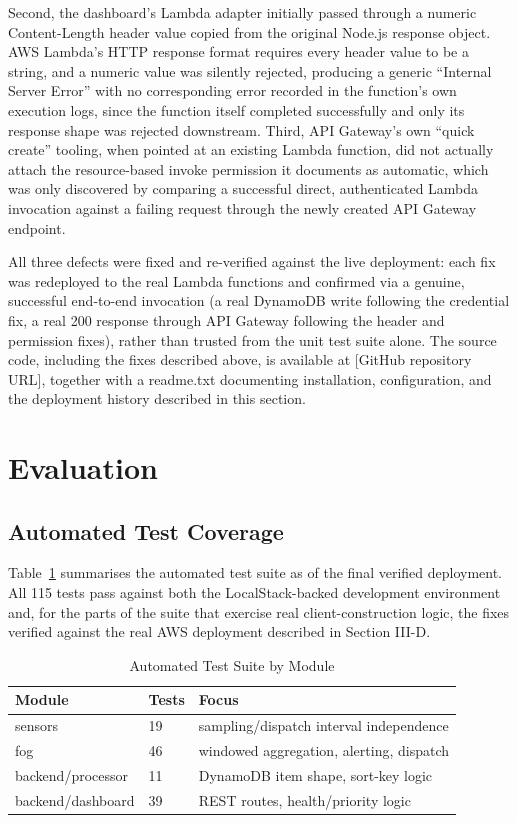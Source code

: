 \documentclass[conference]{IEEEtran}
\begin{document}
Second, the dashboard's Lambda adapter initially passed through a numeric Content-Length header value copied from the original Node.js response object. AWS Lambda's HTTP response format requires every header value to be a string, and a numeric value was silently rejected, producing a generic ``Internal Server Error'' with no corresponding error recorded in the function's own execution logs, since the function itself completed successfully and only its response shape was rejected downstream. Third, API Gateway's own ``quick create'' tooling, when pointed at an existing Lambda function, did not actually attach the resource-based invoke permission it documents as automatic, which was only discovered by comparing a successful direct, authenticated Lambda invocation against a failing request through the newly created API Gateway endpoint.

All three defects were fixed and re-verified against the live deployment: each fix was redeployed to the real Lambda functions and confirmed via a genuine, successful end-to-end invocation (a real DynamoDB write following the credential fix, a real 200 response through API Gateway following the header and permission fixes), rather than trusted from the unit test suite alone. The source code, including the fixes described above, is available at [GitHub repository URL], together with a readme.txt documenting installation, configuration, and the deployment history described in this section.

\section{Evaluation}

\subsection{Automated Test Coverage}
Table~\ref{tab:tests} summarises the automated test suite as of the final verified deployment. All 115 tests pass against both the LocalStack-backed development environment and, for the parts of the suite that exercise real client-construction logic, the fixes verified against the real AWS deployment described in Section III-D.

\begin{table}[!t]
\caption{Automated Test Suite by Module}
\label{tab:tests}
\centering
\footnotesize
\setlength{\tabcolsep}{4pt}
\begin{tabular}{|p{1.15in}|p{0.35in}|p{1.55in}|}
\hline
\textbf{Module} & \textbf{Tests} & \textbf{Focus} \\
\hline
sensors & 19 & sampling/dispatch interval independence \\
\hline
fog & 46 & windowed aggregation, alerting, dispatch \\
\hline
backend/processor & 11 & DynamoDB item shape, sort-key logic \\
\hline
backend/dashboard & 39 & REST routes, health/priority logic \\
\hline
\end{tabular}
\end{table}
\end{document}
